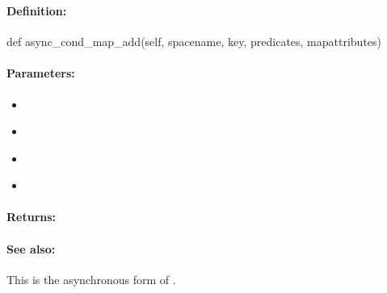 \pagebreak
\subsubsection{}
\label{api:python:async_cond_map_add}


\paragraph{Definition:}
\begin{pythoncode}
def async_cond_map_add(self, spacename, key, predicates, mapattributes)
\end{pythoncode}

\paragraph{Parameters:}
\begin{itemize}[noitemsep]
\item {}\\

\item {}\\

\item {}\\

\item {}\\

\end{itemize}

\paragraph{Returns:}


\paragraph{See also:}  This is the asynchronous form of .

\pagebreak
\subsubsection{}
\label{api:python:map_remove}


